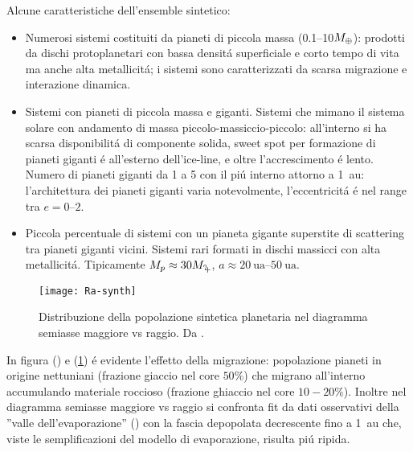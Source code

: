 Alcune caratteristiche dell'ensemble sintetico: %
\begin{itemize}
\item Numerosi sistemi costituiti da pianeti di piccola massa (\numrange{0.1}{10}$M_{\oplus}{}$): prodotti da dischi protoplanetari con bassa densit\'a superficiale e corto tempo di vita ma anche alta metallicit\'a; i sistemi sono caratterizzati da scarsa migrazione e interazione dinamica.
\item Sistemi con pianeti di piccola massa e giganti. Sistemi che mimano il sistema solare con andamento di massa piccolo-massiccio-piccolo: all'interno si ha scarsa disponibilit\'a di componente solida, sweet spot per formazione di pianeti giganti \'e all'esterno dell'ice-line, e oltre l'accrescimento \'e lento. Numero di pianeti giganti da 1 a 5 con il pi\'u interno attorno a \SI{1}{\astronomicalunit}: l'architettura dei pianeti giganti varia notevolmente, l'eccentricit\'a \'e nel range tra $e=\numrange{0}{2}$.
\item Piccola percentuale di sistemi con un pianeta gigante superstite di scattering tra pianeti giganti vicini. Sistemi rari formati in dischi massicci con alta metallicit\'a. Tipicamente $M_p\approx30\mjupiter{}$, $a\approx\SIrange{20}{50}{\astronomicalunit}$.
\end{itemize}

\begin{figure}[!ht]
	\texttt{[image: Ra-synth]}
	\caption{Distribuzione della popolazione sintetica planetaria nel diagramma semiasse maggiore vs raggio. Da \cite{mordasini2018planetary}.}\label{fig:Ra-synth}
\end{figure}

In figura () e (\ref{fig:Ra-synth}) \'e evidente l'effetto della migrazione: popolazione pianeti in origine nettuniani (frazione giaccio nel core $50\%$) che migrano all'interno accumulando materiale roccioso (frazione ghiaccio nel core $10-20\%$). Inoltre nel diagramma semiasse maggiore vs raggio si confronta fit da dati osservativi della ''valle dell'evaporazione'' (\cite{van2018asteroseismic}) con la fascia depopolata decrescente fino a \SI{1}{\astronomicalunit} che, viste le semplificazioni del modello di evaporazione, risulta pi\'u ripida.

